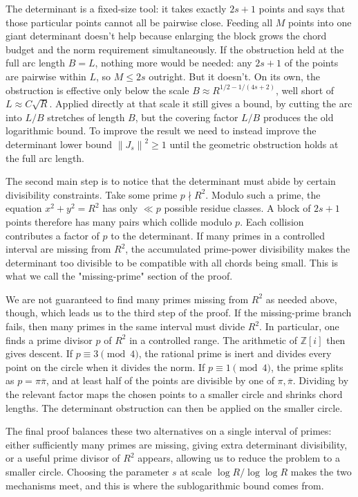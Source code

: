 \documentclass[11pt]{article}
\newcommand{\Z}{\mathbb Z}
\newcommand{\Norm}[1]{\left\lVert#1\right\rVert^2}
\begin{document}
The determinant is a fixed-size tool: it takes exactly \(2s+1\) points and says that those particular points cannot all be pairwise close.
Feeding all \(M\) points into one giant determinant doesn't help because enlarging the block grows the chord budget and the norm requirement simultaneously.
If the obstruction held at the full arc length \(B=L\), nothing more would be needed: any \(2s+1\) of the points are pairwise within \(L\), so \(M\le 2s\) outright.
But it doesn't.
On its own, the obstruction is effective only below the scale \(B\approx R^{1/2-1/(4s+2)}\), well short of \(L\approx C\sqrt R\).
Applied directly at that scale it still gives a bound, by cutting the arc into \(L/B\) stretches of length \(B\), but the covering factor \(L/B\) produces the old logarithmic bound.
To improve the result we need to instead improve the determinant lower bound \(\Norm{J_s}\ge1\) until the geometric obstruction holds at the full arc length.

The second main step is to notice that the determinant must abide by certain divisibility constraints.
Take some prime \(p\nmid R^2\).
Modulo such a prime, the equation \(x^2+y^2=R^2\) has only \(\ll p\) possible residue classes.
A block of \(2s+1\) points therefore has many pairs which collide modulo \(p\).
Each collision contributes a factor of \(p\) to the determinant.
If many primes in a controlled interval are missing from \(R^2\), the accumulated prime-power divisibility makes the determinant too divisible to be compatible with all chords being small.
This is what we call the "missing-prime" section of the proof.

We are not guaranteed to find many primes missing from $R^2$ as needed above, though, which leads us to the third step of the proof.
If the missing-prime branch fails, then many primes in the same interval must divide \(R^2\).
In particular, one finds a prime divisor \(p\) of \(R^2\) in a controlled range.
The arithmetic of \(\Z[i]\) then gives descent.
If \(p\equiv 3\pmod 4\), the rational prime is inert and divides every point on the circle when it divides the norm.
If \(p\equiv 1\pmod 4\), the prime splits as \(p=\pi\overline\pi\), and at least half of the points are divisible by one of \(\pi,\overline\pi\).
Dividing by the relevant factor maps the chosen points to a smaller circle and shrinks chord lengths.
The determinant obstruction can then be applied on the smaller circle.

The final proof balances these two alternatives on a single interval of primes: either sufficiently many primes are missing, giving extra determinant divisibility, or a useful prime divisor of \(R^2\) appears, allowing us to reduce the problem to a smaller circle.
Choosing the parameter \(s\) at scale \(\log R/\log\log R\) makes the two mechanisms meet, and this is where the sublogarithmic bound comes from.
\end{document}

